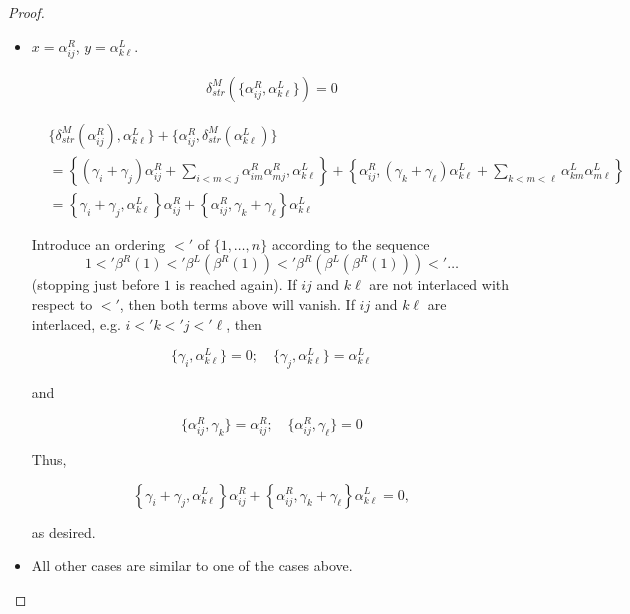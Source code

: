 \documentclass[a4paper,final, reqno]{amsart}
\theoremstyle{plain}
\theoremstyle{definition}
\begin{document}
\begin{proof}
\begin{itemize}
\begin{enumerate}[label=Case \arabic*.]
				\begin{align*}
					\{\delta_{str}^M(\alpha_{ij}^R), \beta_{k\ell}^R\} &= (\gamma_i+\gamma_j) \alpha_{ij}^R + \sum_{i<m<j} \alpha_{im}^R\alpha_{mj}^R \\
					&= \delta_{str}^M(\alpha_{ij}^R) \\
					&= \delta_{str}^M\left(\{\alpha_{ij}^R,\beta_{k\ell}^R\}\right)
				\end{align*}
				
				as desired.
				
			\end{enumerate}
			
			
			\item $x=\alpha_{ij}^R$, $y=\alpha_{k\ell}^L$. 
			
			\begin{align*}
				\delta_{str}^M\left(\{\alpha_{ij}^R,\alpha_{k\ell}^L\}\right) = 0
			\end{align*}
			
			\begin{align*}
				& \{\delta_{str}^M(\alpha_{ij}^R), \alpha_{k\ell}^L\} + \{\alpha_{ij}^R, \delta_{str}^M(\alpha_{k\ell}^L)\} \\
				&=\left\{(\gamma_i+\gamma_j)\alpha_{ij}^R + \sum_{i<m<j} \alpha_{im}^R\alpha_{mj}^R , \alpha_{k\ell}^L\right\} + \left\{\alpha_{ij}^R, (\gamma_k+\gamma_{\ell}) \alpha_{k\ell}^L + \sum_{k<m<\ell} \alpha_{km}^L \alpha_{m\ell}^L  \right\} \\
				&= \left\{\gamma_i+\gamma_j , \alpha_{k\ell}^L\right\}\alpha_{ij}^R + \left\{\alpha_{ij}^R, \gamma_k+\gamma_{\ell}   \right\}\alpha_{k\ell}^L
			\end{align*}
			
			Introduce an ordering $<'$ of $\{1,\dots, n\}$ according to the sequence 
			\[ 1 <' \beta^R(1) <' \beta^L(\beta^R(1)) <' \beta^R(\beta^L(\beta^R(1))) <' \dots \]
			(stopping just before $1$ is reached again).
			If $ij$ and $k\ell$ are not interlaced with respect to $<'$, then both terms above will vanish. If $ij$ and $k\ell$ are interlaced, e.g. $i<'k<'j<'\ell$, then
			
			\[ \{\gamma_i, \alpha_{k\ell}^L\} = 0; \quad \{\gamma_j, \alpha_{k\ell}^L\} = \alpha_{k\ell}^L \]
			
			and 
			
			\[ \{\alpha_{ij}^R, \gamma_k\} = \alpha_{ij}^R; \quad \{\alpha_{ij}^R, \gamma_\ell\} = 0 \]
			
			
			Thus, 
			
			\[ \left\{\gamma_i+\gamma_j , \alpha_{k\ell}^L\right\}\alpha_{ij}^R + \left\{\alpha_{ij}^R, \gamma_k+\gamma_{\ell}   \right\}\alpha_{k\ell}^L = 0,\]
			
			as desired.
			
			
			
			
			\item All other cases are similar to one of the cases above.
			
			
			
			
			
		\end{itemize}
	\end{proof}
	
\end{document}
